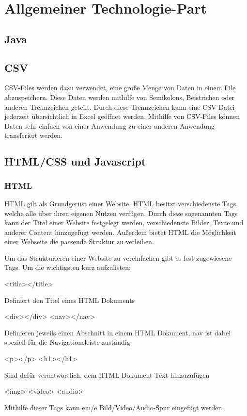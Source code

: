 \section{Allgemeiner Technologie-Part}


\subsection{Java}
\subsection{CSV}
CSV-Files werden dazu verwendet, eine große Menge von Daten in einem File abzuspeichern. Diese Daten werden mithilfe von Semikolons, Beistrichen oder anderen Trennzeichen geteilt. Durch diese Trennzeichen kann eine CSV-Datei jederzeit übersichtlich in Excel geöffnet werden. Mithilfe von CSV-Files können Daten sehr einfach von einer Anwendung zu einer anderen Anwendung transferiert werden.  


\subsection{HTML/CSS und Javascript}


\subsubsection{HTML}
HTML gilt als Grundgerüst einer Website. HTML besitzt verschiedenste Tags, welche alle über ihren eigenen Nutzen verfügen. Durch diese sogenannten Tags kann der Titel einer Website festgelegt werden, verschiedenste Bilder, Texte und anderer Content hinzugefügt werden. Außerdem bietet HTML die Möglichkeit einer Webseite die passende Struktur zu verleihen. 

Um das Strukturieren einer Website zu vereinfachen gibt es fest-zugewiesene Tags. Um die wichtigsten kurz aufzulisten:

\begin{compactitem}
    \item [<title></title>]
    \item Definiert den Titel eines HTML Dokuments
    \item [<div></div> <nav></nav>]
    \item Definieren jeweils einen Abschnitt in einem HTML Dokument, nav ist dabei speziell für die Navigationsleiste zuständig
    \item [<p></p> <h1></h1>]
    \item Sind dafür verantwortlich, dem HTML Dokument Text hinzuzufügen
    \item [<img> <video> <audio>]
    \item Mithilfe dieser Tags kann ein/e Bild/Video/Audio-Spur eingefügt werden
\end{compactitem}

